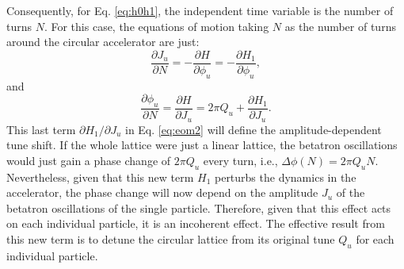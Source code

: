 Consequently, for Eq. \ref{eq:h0h1}, the independent time variable is the number of turns $N$. For this case, the equations of motion taking $N$ as the number of turns around the circular accelerator are just:
\begin{equation}
    \label{eq:eom1}
    \frac{\partial J_u}{\partial N} = -\frac{\partial H}{\partial \phi_u} = -\frac{\partial H_1}{\partial \phi_u},
\end{equation}
and
\begin{equation}
    \label{eq:eom2}
    \frac{\partial \phi_u}{\partial N} = \frac{\partial H}{\partial J_u} = 2\pi Q_u + \frac{\partial H_1}{\partial J_u}.
\end{equation}
This last term ${\partial H_1}/{\partial J_u}$ in Eq. \ref{eq:eom2} will define the amplitude-dependent tune shift. If the whole lattice were just a linear lattice, the betatron oscillations would just gain a phase change of $2\pi Q_u$ every turn, i.e., $\Delta \phi(N)=2\pi Q_u N$. Nevertheless, given that this new term $H_1$ perturbs the dynamics in the accelerator, the phase change will now depend on the amplitude $J_u$ of the betatron oscillations of the single particle. Therefore, given that this effect acts on each individual particle, it is an incoherent effect. The effective result from this new term is to detune the circular lattice from its original tune $Q_u$ for each individual particle.

